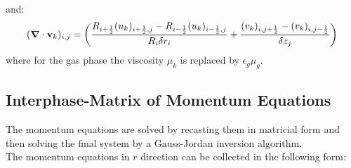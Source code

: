 %
and:
%
\begin{eqnarray}
\htmlimage{}
(\mbox{\boldmath $\nabla$} \cdot {\bf v}_{k})_{i,j} = 
\bigg( \frac{R_{i+\frac{1}{2}} (u_k)_{i+\frac{1}{2},j} - 
R_{i-\frac{1}{2}} (u_k)_{i-\frac{1}{2},j}} {R_{i} \delta r_{i}} + 
\frac{(v_k)_{i,j+\frac{1}{2}} - (v_k)_{i,j-\frac{1}{2}}} {\delta z_{j}} \bigg)
\nonumber
\end{eqnarray}
%
where for the gas phase the viscosity $\mu_k$ is replaced 
by $\epsilon_g \mu_g$.\\[3mm]
%
\newpage
\subsection{Interphase-Matrix of Momentum Equations}

The momentum equations are solved by recasting them in matricial 
form and then solving  the final system by a Gauss-Jordan inversion algorithm. \\
The momentum equations in $r$ direction can be collected in the following form:

